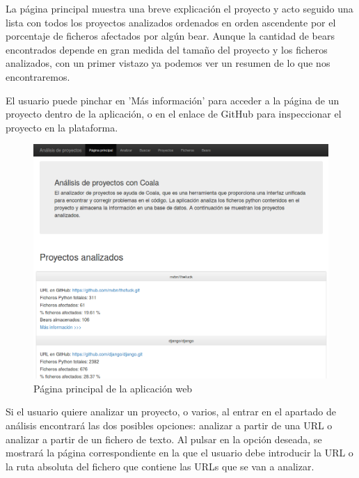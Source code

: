 \documentclass[a4paper, 12pt]{book}
\begin{document}
La página principal muestra una breve explicación el proyecto y acto seguido una lista con todos los proyectos analizados ordenados en orden ascendente por el porcentaje de ficheros afectados por algún bear. Aunque la cantidad de bears encontrados depende en gran medida del tamaño del proyecto y los ficheros analizados, con un primer vistazo ya podemos ver un resumen de lo que nos encontraremos.

El usuario puede pinchar en 'Más información' para acceder a la página de un proyecto dentro de la aplicación, o en el enlace de GitHub para inspeccionar el proyecto en la plataforma.

\begin{figure}[H]
  \centering
  \includegraphics[width=12cm, keepaspectratio]{img/homePage}
  \caption{Página principal de la aplicación web}
  \label{fig:homePage}
\end{figure}

Si el usuario quiere analizar un proyecto, o varios, al entrar en el apartado de análisis encontrará las dos posibles opciones: analizar a partir de una URL o analizar a partir de un fichero de texto. Al pulsar en la opción deseada, se mostrará la página correspondiente en la que el usuario debe introducir la URL o la ruta absoluta del fichero que contiene las URLs que se van a analizar.
\end{document}
